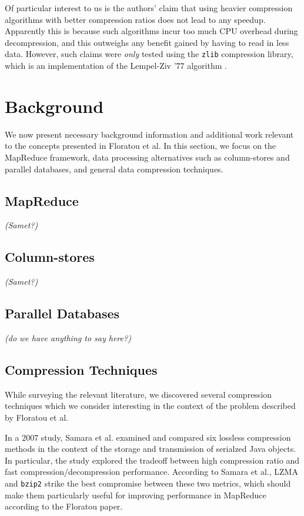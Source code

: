 \documentclass[twocolumn]{article}
\begin{document}
Of particular interest to us is the authors' claim that using heavier compression
algorithms with better compression ratios does not lead to any speedup.  Apparently
this is because such algorithms incur too much CPU overhead during decompression,
and this outweighs any benefit gained by having to read in less data.  However,
such claims were \emph{only} tested using the \verb+zlib+ compression library,
which is an implementation of the Lempel-Ziv '77 algorithm \cite{ref:lz77}.

\section{Background}

We now present necessary background information and additional work
relevant to the concepts presented in Floratou et al.  In this section,
we focus on the MapReduce framework, data processing alternatives such
as column-stores and parallel databases, and general data compression
techniques.

\subsection{MapReduce}

\emph{(Samet?)}

\subsection{Column-stores}

\emph{(Samet?)}

\subsection{Parallel Databases}

\emph{(do we have anything to say here?)}

\subsection{Compression Techniques}

While surveying the relevant literature, we discovered several
compression techniques which we consider interesting in the context
of the problem described by Floratou et al.

In a 2007 study, Samara et al. \cite{ref:comp-study} examined and compared
six lossless compression methods in the context of the storage and
transmission of serialzed Java objects.  In particular, the study
explored the tradeoff between high compression
ratio and fast compression/decompression performance.  According to Samara
et al., LZMA and \verb+bzip2+ strike the best compromise between these
two metrics, which should make them particularly useful for improving
performance in MapReduce according to the Floratou paper.
\end{document}
